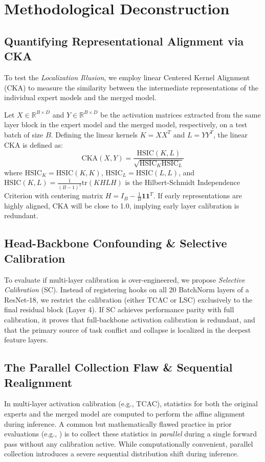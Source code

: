 \documentclass{article}
\theoremstyle{plain}
\theoremstyle{definition}
\theoremstyle{remark}
\begin{document}
\section{Methodological Deconstruction}
\label{sec:methodology}

\subsection{Quantifying Representational Alignment via CKA}
To test the \textit{Localization Illusion}, we employ linear Centered Kernel Alignment (CKA) \cite{kornblith2019similarity} to measure the similarity between the intermediate representations of the individual expert models and the merged model. 

Let $X \in \mathbb{R}^{B \times D}$ and $Y \in \mathbb{R}^{B \times D}$ be the activation matrices extracted from the same layer block in the expert model and the merged model, respectively, on a test batch of size $B$. Defining the linear kernels $K = X X^T$ and $L = Y Y^T$, the linear CKA is defined as:
\begin{equation}
\text{CKA}(X, Y) = \frac{\text{HSIC}(K, L)}{\sqrt{\text{HSIC}_{K} \text{HSIC}_{L}}}
\end{equation}
where $\text{HSIC}_K = \text{HSIC}(K, K)$, $\text{HSIC}_L = \text{HSIC}(L, L)$, and $\text{HSIC}(K, L) = \frac{1}{(B-1)^2} \text{tr}(K H L H)$ is the Hilbert-Schmidt Independence Criterion with centering matrix $H = I_B - \frac{1}{B} \mathbf{1} \mathbf{1}^T$. If early representations are highly aligned, CKA will be close to 1.0, implying early layer calibration is redundant.

\subsection{Head-Backbone Confounding \& Selective Calibration}
To evaluate if multi-layer calibration is over-engineered, we propose \textit{Selective Calibration} (SC). Instead of registering hooks on all 20 BatchNorm layers of a ResNet-18, we restrict the calibration (either TCAC or LSC) exclusively to the final residual block (Layer 4). If SC achieves performance parity with full calibration, it proves that full-backbone activation calibration is redundant, and that the primary source of task conflict and collapse is localized in the deepest feature layers.

\subsection{The Parallel Collection Flaw \& Sequential Realignment}
In multi-layer activation calibration (e.g., TCAC), statistics for both the original experts and the merged model are computed to perform the affine alignment during inference. A common but mathematically flawed practice in prior evaluations (e.g., \cite{lsc2026}) is to collect these statistics in \textit{parallel} during a single forward pass without any calibration active. While computationally convenient, parallel collection introduces a severe sequential distribution shift during inference.
\end{document}
